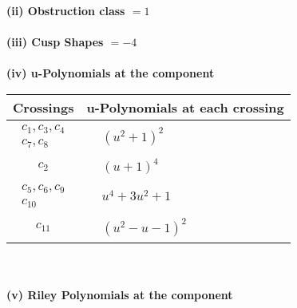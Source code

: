 \documentclass[1p]{elsarticle_modified}
\theoremstyle{definition}
\begin{document}
\flushleft \textbf{(ii) Obstruction class $= 1$}\\~\\
\flushleft \textbf{(iii) Cusp Shapes $= -4$}\\~\\
\newpage\renewcommand{\arraystretch}{1}
\flushleft \textbf{(iv) u-Polynomials at the component}\newline \\
\begin{tabular}{m{50pt}|m{274pt}}
Crossings & \hspace{64pt}u-Polynomials at each crossing \\
\hline $$\begin{aligned}c_{1},c_{3},c_{4}\\c_{7},c_{8}\end{aligned}$$&$\begin{aligned}
&(u^2+1)^2
\end{aligned}$\\
\hline $$\begin{aligned}c_{2}\end{aligned}$$&$\begin{aligned}
&(u+1)^4
\end{aligned}$\\
\hline $$\begin{aligned}c_{5},c_{6},c_{9}\\c_{10}\end{aligned}$$&$\begin{aligned}
&u^4+3 u^2+1
\end{aligned}$\\
\hline $$\begin{aligned}c_{11}\end{aligned}$$&$\begin{aligned}
&(u^2- u-1)^2
\end{aligned}$\\
\hline
\end{tabular}\\~\\
\newpage\renewcommand{\arraystretch}{1}
\flushleft \textbf{(v) Riley Polynomials at the component}\newline \\
\end{document}
